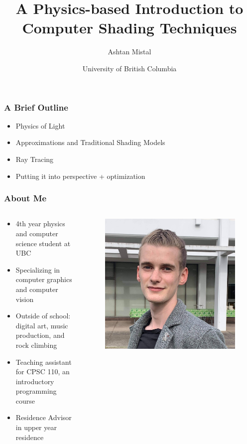 \documentclass[12pt]{beamer}
\title{A Physics-based Introduction to Computer Shading Techniques}
\author{Ashtan Mistal}
\date{University of British Columbia}
\begin{document}
  \begin{frame}
    \titlepage
  \end{frame}

  \begin{frame}
    \frametitle{A Brief Outline}
    \begin{itemize}
      \item Physics of Light
      \item Approximations and Traditional Shading Models
      \item Ray Tracing
      \item Putting it into perspective + optimization
    \end{itemize}
  \end{frame}

  \begin{frame}
    \frametitle{About Me}
    \begin{columns}
      \begin{column}{0.6\textwidth}
        \begin{itemize}
          \item 4th year physics and computer science student at UBC
          \item Specializing in computer graphics and computer vision
          \item Outside of school: digital art, music production, and rock climbing
          \item Teaching assistant for CPSC 110, an introductory programming course
          \item Residence Advisor in upper year residence
        \end{itemize}
      \end{column}
      \begin{column}{0.4\textwidth}
        \begin{figure}
          \centering
          \includegraphics[width=\linewidth]{AshtanMistal.jpg}

\end{figure}
\end{column}
\end{columns}
\end{frame}
\end{document}
